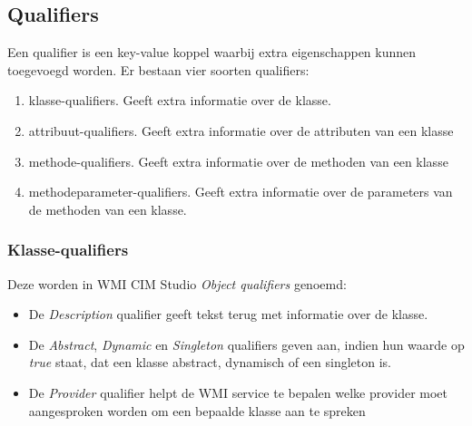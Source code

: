 \documentclass{report}
\begin{document}
	\subsection{Qualifiers}
	Een qualifier is een key-value koppel waarbij extra eigenschappen kunnen toegevoegd worden. Er bestaan vier soorten qualifiers:
	\begin{enumerate}
		\item klasse-qualifiers. Geeft extra informatie over de klasse. 
		\item attribuut-qualifiers. Geeft extra informatie over de attributen van een klasse
		\item methode-qualifiers. Geeft extra informatie over de methoden van een klasse
		\item methodeparameter-qualifiers. Geeft extra informatie over de parameters van de methoden van een klasse.
	\end{enumerate}
	\subsubsection{Klasse-qualifiers}
	Deze worden in WMI CIM Studio \textit{Object qualifiers} genoemd:
	\begin{itemize}
		\item De \textit{Description} qualifier geeft tekst terug met informatie over de klasse.
		\item De \textit{Abstract}, \textit{Dynamic} en \textit{Singleton} qualifiers geven aan, indien hun waarde op \textit{true} staat, dat een klasse abstract, dynamisch of een singleton is.
		\item De \textit{Provider} qualifier helpt de WMI service te bepalen welke provider moet aangesproken worden om een bepaalde klasse aan te spreken
	\end{itemize}
\end{document}
